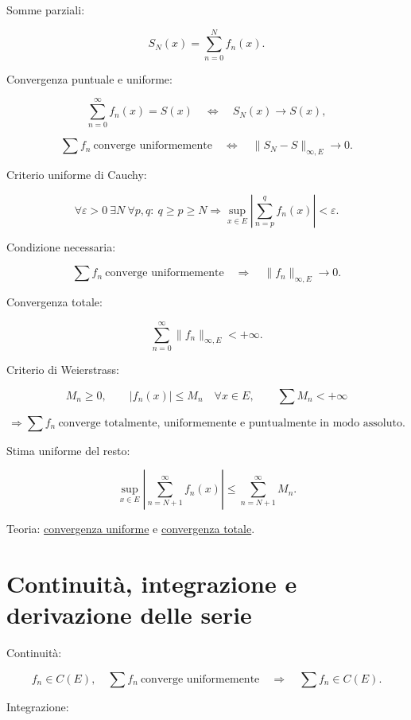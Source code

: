 Somme parziali:

\[
\displaystyle
S_N(x)=\sum_{n=0}^{N}f_n(x).
\]

Convergenza puntuale e uniforme:

\[
\displaystyle
\sum_{n=0}^{\infty}f_n(x)=S(x)
\quad\Longleftrightarrow\quad
S_N(x)\to S(x),
\]

\[
\displaystyle
\sum f_n\ \text{converge uniformemente}
\quad\Longleftrightarrow\quad
\lVert S_N-S\rVert_{\infty,E}\to0.
\]

Criterio uniforme di Cauchy:

\[
\displaystyle
\forall\varepsilon>0\ \exists N\ \forall p,q:
\ q\ge p\ge N
\Longrightarrow
\sup_{x\in E}
\left\lvert\sum_{n=p}^{q}f_n(x)\right\rvert<\varepsilon.
\]

Condizione necessaria:

\[
\displaystyle
\sum f_n\ \text{converge uniformemente}
\quad\Longrightarrow\quad
\lVert f_n\rVert_{\infty,E}\to0.
\]

Convergenza totale:

\[
\displaystyle
\sum_{n=0}^{\infty}\lVert f_n\rVert_{\infty,E}<+\infty.
\]

Criterio di Weierstrass:

\[
\displaystyle
M_n\ge0,\qquad\lvert f_n(x)\rvert\le M_n\quad\forall x\in E,
\qquad
\sum M_n<+\infty
\]

\[
\displaystyle
\Longrightarrow
\sum f_n\ \text{converge totalmente, uniformemente e puntualmente in modo assoluto}.
\]

Stima uniforme del resto:

\[
\displaystyle
\sup_{x\in E}
\left\lvert
\sum_{n=N+1}^{\infty}f_n(x)
\right\rvert
\le
\sum_{n=N+1}^{\infty}M_n.
\]

Teoria: \href{https://ingegnerismo.it/matematica/convergenza-uniforme/}{convergenza uniforme} e \href{https://ingegnerismo.it/matematica/convergenza-totale/}{convergenza totale}.

\section{Continuità, integrazione e derivazione delle serie}\label{continuituxe0-integrazione-e-derivazione-delle-serie}

Continuità:

\[
\displaystyle
f_n\in C(E),\quad
\sum f_n\ \text{converge uniformemente}
\quad\Longrightarrow\quad
\sum f_n\in C(E).
\]

Integrazione:

